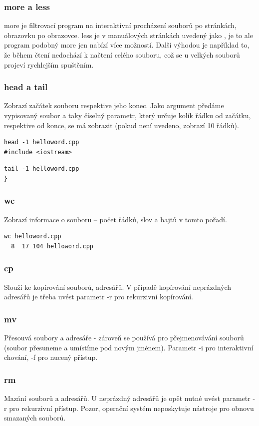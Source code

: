 \documentclass{article}
\begin{document}
\subsubsection{more a less}
more je filtrovací program na interaktivní procházení souborů po stránkách, obrazovku po obrazovce. less je v manuálových stránkách uvedený jako , je to ale program podobný more jen nabízí více možností. Další výhodou je například to, že během čtení nedochází k načtení celého souboru, což se u velkých souborů projeví rychlejším spuštěním.

\subsubsection{head a tail}
Zobrazí začátek souboru respektive jeho konec. Jako argument předáme vypisovaný soubor a taky číselný parametr, který určuje kolik řádku od začátku, respektive od konce, se má zobrazit (pokud není uvedeno, zobrazí 10 řádků).
\begin{verbatim}
head -1 helloword.cpp
#include <iostream>
\end{verbatim}

\begin{verbatim}
tail -1 helloword.cpp
}
\end{verbatim}

\subsubsection{wc}
Zobrazí informace o souboru -- počet řádků, slov a bajtů v tomto pořadí.
\begin{verbatim}
wc helloword.cpp
  8  17 104 helloword.cpp
\end{verbatim}

\subsubsection{cp}
Slouží ke kopírování souborů, adresářů. V případě kopírování neprázdných adresářů je třeba uvést parametr -r pro rekurzivní kopírování.

\subsubsection{mv}
Přesouvá soubory a adresáře - zároveň se používá pro přejmenovávání souborů (soubor přesuneme a umístíme pod novým jménem). Parametr -i pro interaktivní chování, -f pro nucený přístup.

\subsubsection{rm}
Mazání souborů a adresářů. U neprázdný adresářů je opět nutné uvést parametr -r pro rekurzivní přístup. Pozor, operační systém neposkytuje nástroje pro obnovu smazaných souborů.
\end{document}
